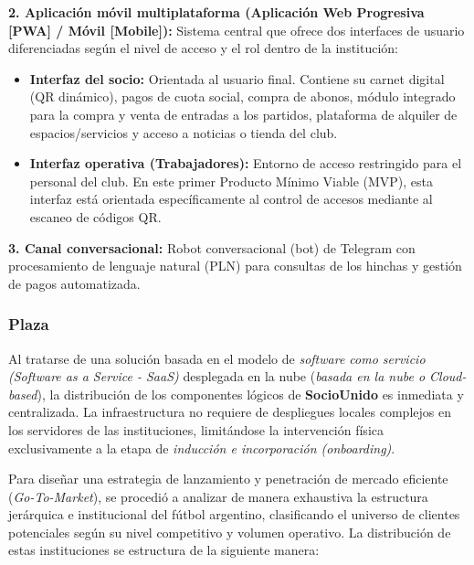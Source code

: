 \textbf{2. Aplicación móvil multiplataforma (Aplicación Web Progresiva [PWA] / Móvil [Mobile]):} Sistema central que ofrece dos interfaces de usuario diferenciadas según el nivel de acceso y el rol dentro de la institución:
\begin{itemize}
    \item \textbf{Interfaz del socio:} Orientada al usuario final. Contiene su carnet digital (QR dinámico), pagos de cuota social, compra de abonos, módulo integrado para la compra y venta de entradas a los partidos, plataforma de alquiler de espacios/servicios y acceso a noticias o tienda del club.
    \item \textbf{Interfaz operativa (Trabajadores):} Entorno de acceso restringido para el personal del club. En este primer Producto Mínimo Viable (MVP), esta interfaz está orientada específicamente al control de accesos mediante al escaneo de códigos QR.
\end{itemize}

\textbf{3. Canal conversacional:} Robot conversacional (bot) de Telegram con procesamiento de lenguaje natural (PLN) para consultas de los hinchas y gestión de pagos automatizada.

\newpage

\subsubsection*{Plaza}

Al tratarse de una solución basada en el modelo de \textit{software como servicio (Software as a Service - SaaS)} desplegada en la nube (\textit{basada en la nube o Cloud-based}), la distribución de los componentes lógicos de \textbf{SocioUnido} es inmediata y centralizada. La infraestructura no requiere de despliegues locales complejos en los servidores de las instituciones, limitándose la intervención física exclusivamente a la etapa de \textit{inducción e incorporación (onboarding)}.

Para diseñar una estrategia de lanzamiento y penetración de mercado eficiente (\textit{Go-To-Market}), se procedió a analizar de manera exhaustiva la estructura jerárquica e institucional del fútbol argentino, clasificando el universo de clientes potenciales según su nivel competitivo y volumen operativo. La distribución de estas instituciones se estructura de la siguiente manera:


